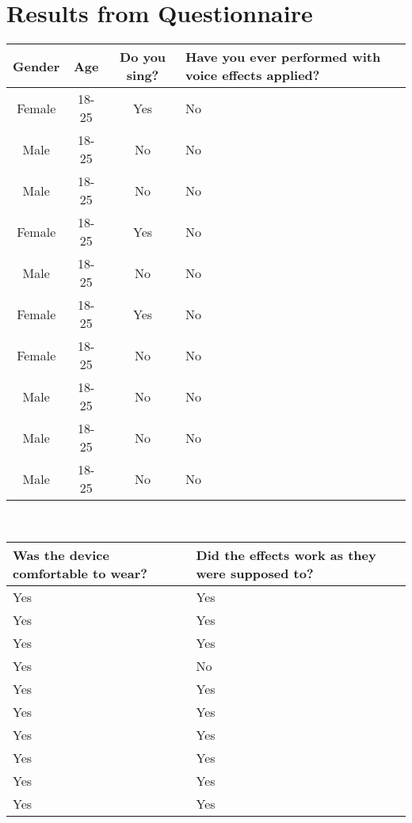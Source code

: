 \section{Results from Questionnaire}\label{AX}
\begin{center}

\begin{tabular}{| c | c | c | p{5cm} | }
\hline
Gender & Age & Do you sing? & Have you ever performed with voice effects applied? \\ \hline
Female & 18-25 & Yes & No \\ \hline
Male & 18-25 & No & No \\ \hline
Male & 18-25 & No & No \\ \hline
Female & 18-25 & Yes & No \\ \hline
Male & 18-25 & No & No \\ \hline
Female & 18-25 & Yes & No \\ \hline
Female & 18-25 & No & No \\ \hline
Male & 18-25 & No & No \\ \hline
Male & 18-25 & No & No \\ \hline
Male & 18-25 & No & No \\ \hline
\end{tabular}\\

\begin{tabular}{| p{5cm} |  p{5cm} |}
\hline
Was the device comfortable to wear? & Did the effects work as they were supposed to?  \\ \hline
Yes & Yes   \\ \hline
Yes & Yes  \\ \hline
Yes & Yes\\ \hline
Yes & No  \\ \hline
Yes & Yes \\ \hline
Yes & Yes  \\ \hline
Yes & Yes  \\ \hline
Yes & Yes  \\ \hline
Yes & Yes  \\ \hline
Yes & Yes \\ \hline
\end{tabular}\\


\end{center}
